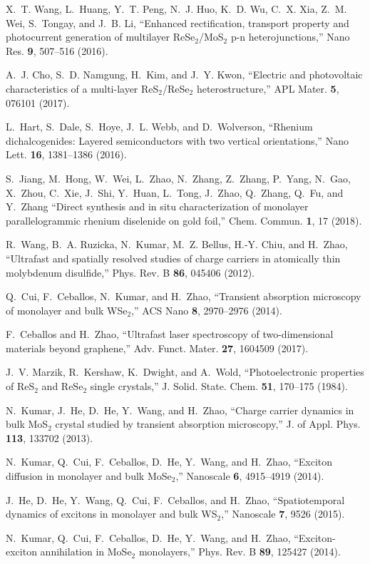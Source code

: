 \documentclass{osa-article}
\begin{document}
\begin{thebibliography}{1}
X.~T. Wang, L.~Huang, Y.~T. Peng, N.~J. Huo, K.~D. Wu, C.~X. Xia, Z.~M. Wei,
  S.~Tongay, and J.~B. Li, \enquote{Enhanced rectification, transport property
  and photocurrent generation of multilayer {ReSe$_2$/MoS$_2$ p-n}
  heterojunctions,} Nano Res. \textbf{9}, 507--516 (2016).

A.~J. Cho, S.~D. Namgung, H.~Kim, and J.~Y. Kwon, \enquote{Electric and
  photovoltaic characteristics of a multi-layer {ReS$_2$/ReSe$_2$}
  heterostructure,} APL Mater. \textbf{5}, 076101 (2017).

L.~Hart, S.~Dale, S.~Hoye, J.~L. Webb, and D.~Wolverson, \enquote{Rhenium
  dichalcogenides: Layered semiconductors with two vertical orientations,} Nano
  Lett. \textbf{16}, 1381--1386 (2016).

S.~Jiang, M.~Hong, W.~Wei, L.~Zhao, N.~Zhang, Z.~Zhang, P.~Yang, N.~Gao, X.~Zhou, C.~Xie, J.~Shi, Y.~Huan, L.~Tong, J.~Zhao, Q.~Zhang, Q.~Fu, and Y.~Zhang
  \enquote{Direct synthesis and in situ characterization of monolayer parallelogrammic rhenium diselenide on gold foil,} Chem. Commun.
  \textbf{1}, 17 (2018).
  
R.~Wang, B.~A. Ruzicka, N.~Kumar, M.~Z. Bellus, H.-Y. Chiu, and H.~Zhao,
  \enquote{Ultrafast and spatially resolved studies of charge carriers in
  atomically thin molybdenum disulfide,} Phys. Rev. B \textbf{86}, 045406
  (2012).

Q.~Cui, F.~Ceballos, N.~Kumar, and H.~Zhao, \enquote{Transient absorption
  microscopy of monolayer and bulk {WSe$_2$},} ACS Nano \textbf{8}, 2970--2976
  (2014).

F.~Ceballos and H.~Zhao, \enquote{Ultrafast laser spectroscopy of
  two-dimensional materials beyond graphene,} Adv. Funct. Mater. \textbf{27},
  1604509 (2017).

J.~V. Marzik, R.~Kershaw, K.~Dwight, and A.~Wold, \enquote{Photoelectronic
  properties of {ReS$_2$ and ReSe$_2$} single crystals,} J. Solid. State. Chem.
  \textbf{51}, 170--175 (1984).

N.~Kumar, J.~He, D.~He, Y.~Wang, and H.~Zhao, \enquote{Charge carrier dynamics
  in bulk {MoS$_2$} crystal studied by transient absorption microscopy,} J. of
  Appl. Phys. \textbf{113}, 133702 (2013).

N.~Kumar, Q.~Cui, F.~Ceballos, D.~He, Y.~Wang, and H.~Zhao, \enquote{Exciton
  diffusion in monolayer and bulk {MoSe$_2$},} Nanoscale \textbf{6}, 4915--4919
  (2014).

J.~He, D.~He, Y.~Wang, Q.~Cui, F.~Ceballos, and H.~Zhao,
  \enquote{Spatiotemporal dynamics of excitons in monolayer and bulk WS$_2$,}
  Nanoscale \textbf{7}, 9526 (2015).

N.~Kumar, Q.~Cui, F.~Ceballos, D.~He, Y.~Wang, and H.~Zhao,
  \enquote{Exciton-exciton annihilation in {MoSe$_2$} monolayers,} Phys. Rev. B
  \textbf{89}, 125427 (2014).


\end{thebibliography}
\end{document}

